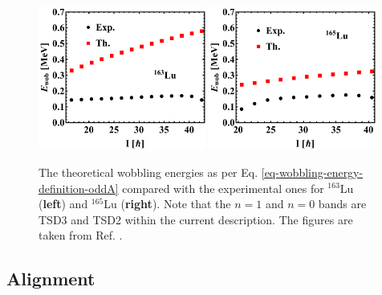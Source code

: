 \begin{figure}
    \centering
    \includegraphics[width=0.49\textwidth]{Chapters/Figures/Lu-exp-energies/fig6a.pdf}
    \includegraphics[width=0.49\textwidth]{Chapters/Figures/Lu-exp-energies/fig6b.pdf}
    \caption{The theoretical wobbling energies as per Eq. \ref{eq-wobbling-energy-definition-oddA} compared with the experimental ones for $^{163}$Lu (\textbf{left}) and $^{165}$Lu (\textbf{right}). Note that the $n=1$ and $n=0$ bands are TSD3 and TSD2 within the current description. The figures are taken from Ref. \cite{raduta2020approach}.}
    \label{experimental-wobbling-energies-Lu-aw1}
\end{figure}

\subsection{Alignment}

